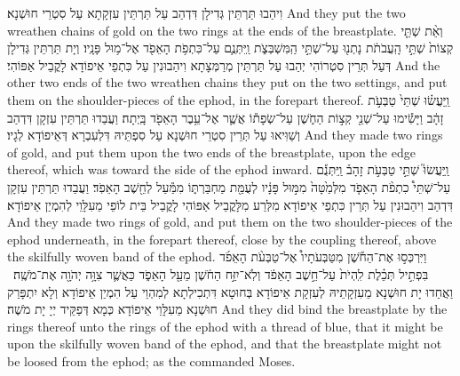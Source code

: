{וִיהַבוּ תַּרְתֵּין גְּדִילָן דִּדְהַב עַל תַּרְתֵּין עִזְקָתָא עַל סִטְרֵי חוּשְׁנָא׃}
{And they put the two wreathen chains of gold on the two rings at the ends of the breastplate.}{}
{וְאֵ֨ת שְׁתֵּ֤י קְצוֹת֙ שְׁתֵּ֣י הָֽעֲבֹתֹ֔ת נָתְנ֖וּ עַל־שְׁתֵּ֣י הַֽמִּשְׁבְּצֹ֑ת וַֽיִּתְּנֻ֛ם עַל־כִּתְפֹ֥ת הָאֵפֹ֖ד אֶל־מ֥וּל פָּנָֽיו׃}
{וְיָת תַּרְתֵּין גְּדִילָן דְּעַל תְּרֵין סִטְרוֹהִי יְהַבוּ עַל תַּרְתֵּין מְרַמְּצָתָא וִיהַבוּנִין עַל כִּתְפֵי אֵיפוֹדָא לָקֳבֵיל אַפּוֹהִי׃}
{And the other two ends of the two wreathen chains they put on the two settings, and put them on the shoulder-pieces of the ephod, in the forepart thereof.}{}
{וַֽיַּעֲשׂ֗וּ שְׁתֵּי֙ טַבְּעֹ֣ת זָהָ֔ב וַיָּשִׂ֕ימוּ עַל־שְׁנֵ֖י קְצ֣וֹת הַחֹ֑שֶׁן עַל־שְׂפָת֕וֹ אֲשֶׁ֛ר אֶל־עֵ֥בֶר הָאֵפֹ֖ד בָּֽיְתָה׃}
{וַעֲבַדוּ תַּרְתֵּין עִזְקָן דִּדְהַב וְשַׁוִּיאוּ עַל תְּרֵין סִטְרֵי חוּשְׁנָא עַל סִפְתֵּיהּ דִּלְעִבְרָא דְּאֵיפוֹדָא לְגָיו׃}
{And they made two rings of gold, and put them upon the two ends of the breastplate, upon the edge thereof, which was toward the side of the ephod inward.}{}
{וַֽיַּעֲשׂוּ֮ שְׁתֵּ֣י טַבְּעֹ֣ת זָהָב֒ וַֽיִּתְּנֻ֡ם עַל־שְׁתֵּי֩ כִתְפֹ֨ת הָאֵפֹ֤ד מִלְּמַ֙טָּה֙ מִמּ֣וּל פָּנָ֔יו לְעֻמַּ֖ת מַחְבַּרְתּ֑וֹ מִמַּ֕עַל לְחֵ֖שֶׁב הָאֵפֹֽד׃}
{וַעֲבַדוּ תַּרְתֵּין עִזְקָן דִּדְהַב וִיהַבוּנִין עַל תְּרֵין כִּתְפֵי אֵיפוֹדָא מִלְּרַע מִלָּקֳבֵיל אַפּוֹהִי לָקֳבֵיל בֵּית לוֹפֵי מֵעִלָּוֵי לְהִמְיַן אֵיפוֹדָא׃}
{And they made two rings of gold, and put them on the two shoulder-pieces of the ephod underneath, in the forepart thereof, close by the coupling thereof, above the skilfully woven band of the ephod.}{}
{וַיִּרְכְּס֣וּ אֶת־הַחֹ֡שֶׁן מִטַּבְּעֹתָיו֩ אֶל־טַבְּעֹ֨ת הָאֵפֹ֜ד בִּפְתִ֣יל תְּכֵ֗לֶת לִֽהְיֹת֙ עַל־חֵ֣שֶׁב הָאֵפֹ֔ד וְלֹֽא־יִזַּ֣ח הַחֹ֔שֶׁן מֵעַ֖ל הָאֵפֹ֑ד כַּאֲשֶׁ֛ר צִוָּ֥ה יְהֹוָ֖ה אֶת־מֹשֶֽׁה׃ \petucha }
{וַאֲחַדוּ יָת חוּשְׁנָא מֵעִזְקָתֵיהּ לְעִזְקָת אֵיפוֹדָא בְּחוּטָא דִּתְכִילְתָא לְמִהְוֵי עַל הִמְיַן אֵיפוֹדָא וְלָא יִתְפָּרַק חוּשְׁנָא מֵעִלָּוֵי אֵיפוֹדָא כְּמָא דְּפַקֵּיד יְיָ יָת מֹשֶׁה׃}
{And they did bind the breastplate by the rings thereof unto the rings of the ephod with a thread of blue, that it might be upon the skilfully woven band of the ephod, and that the breastplate might not be loosed from the ephod; as the \lord\space commanded Moses.}{}
